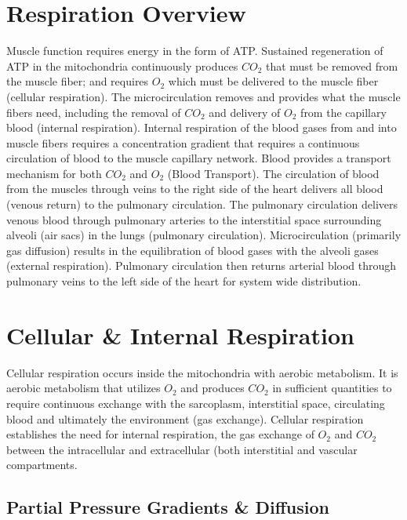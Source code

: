 \section{Respiration Overview}
Muscle function requires energy in the form of ATP. Sustained regeneration of ATP in the mitochondria continuously produces $CO_2$ that must be removed from the muscle fiber; and requires $O_2$ which must be delivered to the muscle fiber (cellular respiration). The microcirculation removes and provides what the muscle fibers need, including the removal of $CO_2$ and delivery of $O_2$ from the capillary blood (internal respiration). Internal respiration of the blood gases from and into muscle fibers requires a concentration gradient that requires a continuous circulation of blood to the muscle capillary network. Blood provides a transport mechanism for both $CO_2$ and $O_2$ (Blood Transport). The circulation of blood from the muscles through veins to the right side of the heart delivers all blood (venous return) to the pulmonary circulation. The pulmonary circulation delivers venous blood through pulmonary arteries to the interstitial space surrounding alveoli (air sacs) in the lungs (pulmonary circulation). Microcirculation (primarily gas diffusion) results in the equilibration of blood gases with the alveoli gases (external respiration). Pulmonary circulation then returns arterial blood through pulmonary veins to the left side of the heart for system wide distribution.

\section{Cellular \& Internal Respiration}

Cellular respiration occurs inside the mitochondria with aerobic metabolism. It is aerobic metabolism that utilizes $O_2$ and produces $CO_2$ in sufficient quantities to require continuous exchange with the sarcoplasm, interstitial space, circulating blood and ultimately the environment (gas exchange). Cellular respiration establishes the need for internal respiration, the gas exchange of $O_2$ and $CO_2$ between the intracellular and extracellular (both interstitial and vascular compartments.

\subsection{Partial Pressure Gradients \& Diffusion}

